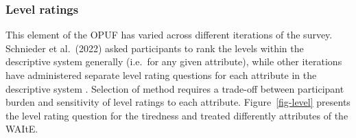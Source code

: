 \documentclass[
  number,
  preprint]{elsarticle}
\begin{document}
\subsubsection{Level ratings}\label{level-ratings}

This element of the OPUF has varied across different iterations of the
survey. Schnieder et al.~(2022) \citep{Schneider2022TheStates} asked
participants to rank the levels within the descriptive system generally
(i.e.~for any given attribute), while other iterations have administered
separate level rating questions for each attribute in the descriptive
system \citep{Bray2024DevelopmentImpairment}. Selection of method
requires a trade-off between participant burden and sensitivity of level
ratings to each attribute. Figure~\ref{fig-level} presents the level
rating question for the tiredness and treated differently attributes of
the WAItE.
\end{document}
